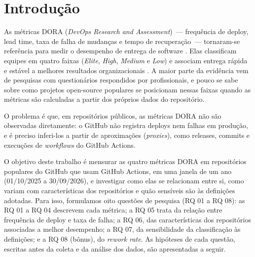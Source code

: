 \section{Introdução}

As métricas DORA (\textit{DevOps Research and Assessment})~--- frequência de deploy, lead time, taxa de falha de mudanças e tempo de recuperação~--- tornaram-se referência para medir o desempenho de entrega de software \cite{forsgren2018accelerate}. Elas classificam equipes em quatro faixas (\textit{Elite}, \textit{High}, \textit{Medium} e \textit{Low}) e associam entrega rápida e estável a melhores resultados organizacionais \cite{dora2024report}. A maior parte da evidência vem de pesquisas com questionários respondidos por profissionais, e pouco se sabe sobre como projetos open-source populares se posicionam nessas faixas quando as métricas são calculadas a partir dos próprios dados do repositório.

O problema é que, em repositórios públicos, as métricas DORA não são observadas diretamente: o GitHub não registra deploys nem falhas em produção, e é preciso inferi-los a partir de aproximações (\textit{proxies}), como releases, commits e execuções de \textit{workflows} do GitHub Actions.

O objetivo deste trabalho é mensurar as quatro métricas DORA em repositórios populares do GitHub que usam GitHub Actions, em uma janela de um ano (01/10/2025 a 30/09/2026), e investigar como elas se relacionam entre si, como variam com características dos repositórios e quão sensíveis são às definições adotadas. Para isso, formulamos oito questões de pesquisa (RQ 01 a RQ 08): as RQ 01 a RQ 04 descrevem cada métrica; a RQ 05 trata da relação entre frequência de deploy e taxa de falha; a RQ 06, das características dos repositórios associadas a melhor desempenho; a RQ 07, da sensibilidade da classificação às definições; e a RQ 08 (bônus), do \textit{rework rate}. As hipóteses de cada questão, escritas antes da coleta e da análise dos dados, são apresentadas a seguir.




